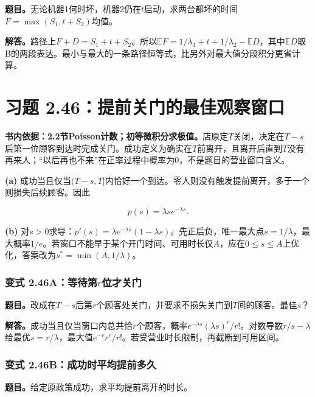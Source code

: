 \documentclass[12pt,a4paper,UTF8,fontset=fandol]{ctexart}
\begin{document}
\textbf{题目。}无论机器1何时坏，机器2仍在\(t\)启动，求两台都坏的时间\(F=\max(S_1,t+S_2)\)均值。

\textbf{解答。}路径上\(F+D=S_1+t+S_2\)。所以\(\mathbb EF=1/\lambda_1+t+1/\lambda_2-\mathbb ED\)，其中\(\mathbb ED\)取B的两段表达。最小与最大的一条路径恒等式，比另外对最大值分段积分更省计算。

\section{习题
2.46：提前关门的最佳观察窗口}\label{ux4e60ux9898-2.46ux63d0ux524dux5173ux95e8ux7684ux6700ux4f73ux89c2ux5bdfux7a97ux53e3}

\textbf{书内依据：2.2节Poisson计数；初等微积分求极值。}店原定\(T\)关闭，决定在\(T-s\)后第一位顾客到达时完成关门。成功定义为确实在\(T\)前离开，且离开后直到\(T\)没有再来人；``以后再也不来''在正率过程中概率为0，不是题目的营业窗口含义。

\textbf{(a)}
成功当且仅当\((T-s,T]\)内恰好一个到达。零人则没有触发提前离开，多于一个则损失后续顾客。因此

\[\boxed{p(s)=\lambda s e^{-\lambda s}.}\]

\textbf{(b)}
对\(s>0\)求导：\(p'(s)=\lambda e^{-\lambda s}(1-\lambda s)\)。先正后负，唯一最大点\(s=1/\lambda\)，最大概率\(\boxed{1/e}\)。若窗口不能早于某个开门时间、可用时长仅\(A\)，应在\(0\le s\le A\)上优化，答案改为\(s^*=\min(A,1/\lambda)\)。

\subsubsection{\texorpdfstring{变式
2.46A：等待第\(r\)位才关门}{变式 2.46A：等待第r位才关门}}\label{ux53d8ux5f0f-2.46aux7b49ux5f85ux7b2crux4f4dux624dux5173ux95e8}

\textbf{题目。}改成在\(T-s\)后第\(r\)个顾客处关门，并要求不损失关门到\(T\)间的顾客。最佳\(s\)？

\textbf{解答。}成功当且仅当窗口内总共恰\(r\)个顾客，概率\(e^{-\lambda s}(\lambda s)^r/r!\)。对数导数\(r/s-\lambda\)给最优\(s=r/\lambda\)，最大值\(e^{-r}r^r/r!\)。若受营业时长限制，再截断到可用区间。

\subsubsection{变式
2.46B：成功时平均提前多久}\label{ux53d8ux5f0f-2.46bux6210ux529fux65f6ux5e73ux5747ux63d0ux524dux591aux4e45}

\textbf{题目。}给定原政策成功，求平均提前离开的时长。
\end{document}
